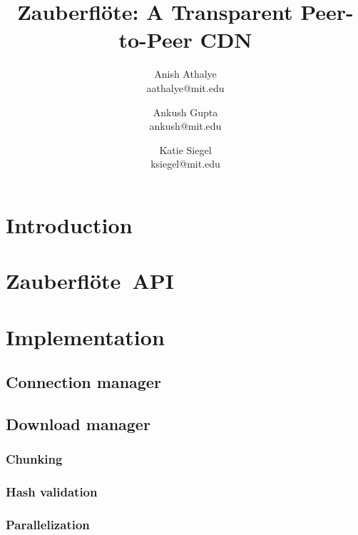 \documentclass[letterpaper,twocolumn,10pt]{article}
\newcommand{\zbf}{Zauberfl\"{o}te}
\newcommand{\projtitle}{\zbf: A Transparent Peer-to-Peer CDN}
\begin{document}
\title{\Large \bf \projtitle}

\author{
    {\rm Anish Athalye}\\
    aathalye@mit.edu
    \and
    {\rm Ankush Gupta}\\
    ankush@mit.edu
    \and
    {\rm Katie Siegel}\\
    ksiegel@mit.edu
}

\maketitle
\thispagestyle{empty}

\begin{abstract}

\end{abstract}

\section{Introduction}


\section{\zbf\ API}


\section{Implementation}


\subsection{Connection manager}


\subsection{Download manager}


\subsubsection{Chunking}


\subsubsection{Hash validation}


\subsubsection{Parallelization}
\end{document}
